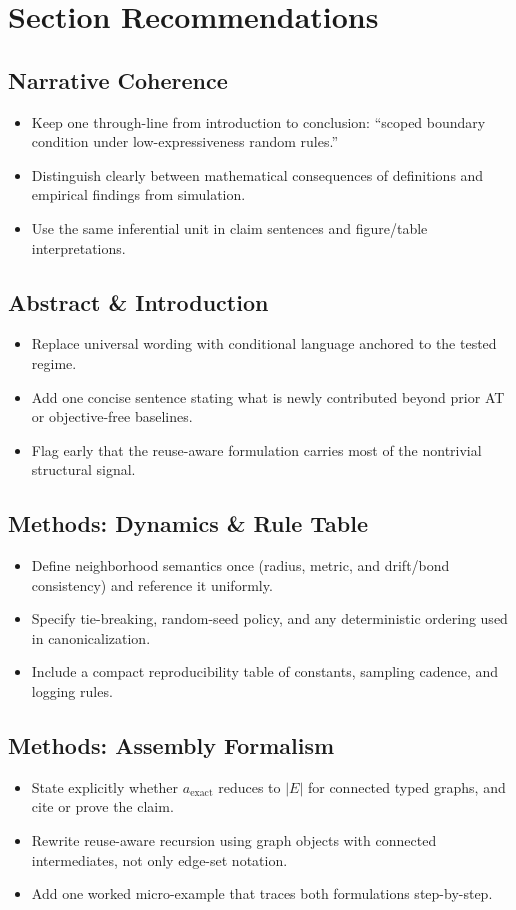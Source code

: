 \documentclass[11pt]{article}
\begin{document}
\section*{Section Recommendations}

\subsection*{Narrative Coherence}
\begin{itemize}
\item Keep one through-line from introduction to conclusion: ``scoped boundary condition under low-expressiveness random rules.''
\item Distinguish clearly between mathematical consequences of definitions and empirical findings from simulation.
\item Use the same inferential unit in claim sentences and figure/table interpretations.
\end{itemize}

\subsection*{Abstract \& Introduction}
\begin{itemize}
\item Replace universal wording with conditional language anchored to the tested regime.
\item Add one concise sentence stating what is newly contributed beyond prior AT or objective-free baselines.
\item Flag early that the reuse-aware formulation carries most of the nontrivial structural signal.
\end{itemize}

\subsection*{Methods: Dynamics \& Rule Table}
\begin{itemize}
\item Define neighborhood semantics once (radius, metric, and drift/bond consistency) and reference it uniformly.
\item Specify tie-breaking, random-seed policy, and any deterministic ordering used in canonicalization.
\item Include a compact reproducibility table of constants, sampling cadence, and logging rules.
\end{itemize}

\subsection*{Methods: Assembly Formalism}
\begin{itemize}
\item State explicitly whether $a_{\text{exact}}$ reduces to $|E|$ for connected typed graphs, and cite or prove the claim.
\item Rewrite reuse-aware recursion using graph objects with connected intermediates, not only edge-set notation.
\item Add one worked micro-example that traces both formulations step-by-step.
\end{itemize}
\end{document}
